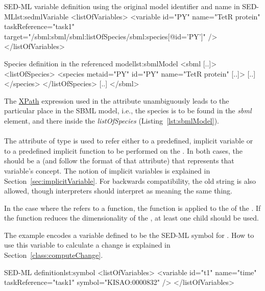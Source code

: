 \begin{myXmlLst}{SED-ML variable definition using the original model identifier and name in SED-ML}{lst:sedmlVariable}
<listOfVariables>
	<variable id="PY" name="TetR protein"  taskReference="task1" 
		target="/sbml:sbml/sbml:listOfSpecies/sbml:species[@id='PY']" />
</listOfVariables>
\end{myXmlLst}

\begin{myXmlLst}{Species definition in the referenced model}{lst:sbmlModel}
<sbml [..]>
	<listOfSpecies>
		<species metaid="PY" id="PY" name="TetR protein" [..]>
		[..]
		</species>
 	</listOfSpecies>
 	[..]
</sbml>
\end{myXmlLst}

The \hyperref[sec:xpath]{XPath} expression used in the  attribute unambiguously leads to the particular place in the SBML model, i.e., the species is to be found in the \emph{sbml} element, and there inside the \emph{listOfSpecies} (Listing~\ref{lst:sbmlModel}). 



\paragraph*{}
\label{sec:symbol}
The  attribute of type  is used to refer either to a predefined, implicit variable or to a predefined implicit function to be performed on the .  In both cases, the  should be a \kisaoID (and follow the format of that attribute) that represents that variable's concept. The notion of implicit variables is explained in Section~\ref{sec:implicitVariable}.  For backwards compatibility, the old string  is also allowed, though interpreters should interpret  as meaning the same thing.

In the case where the  refers to a function, the function is applied to the  of the \Variable.  If the function reduces the dimensionality of the \Variable, at least one \AppliedDimension child should be used.

The example encodes a variable  defined to be the SED-ML symbol for .  How to use this variable to calculate a change is explained in Section~\ref{class:computeChange}.

\begin{myXmlLst}{SED-ML  definition}{lst:symbol}
<listOfVariables>
	<variable id="t1" name="time" taskReference="task1" symbol="KISAO:0000832" />
</listOfVariables>
\end{myXmlLst}

